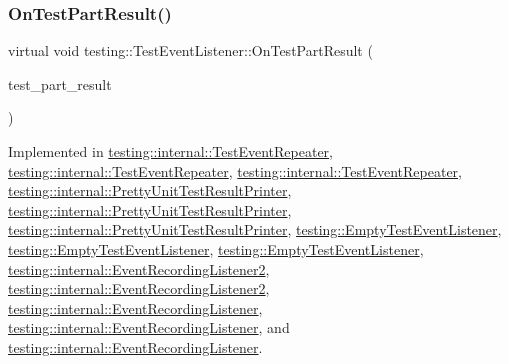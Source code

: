 \subsubsection{\texorpdfstring{OnTestPartResult()}{OnTestPartResult()}\hspace{0.1cm}{\footnotesize\ttfamily [2/3]}}
{\footnotesize\ttfamily virtual void testing\+::\+Test\+Event\+Listener\+::\+On\+Test\+Part\+Result (\begin{DoxyParamCaption}\item[{const Test\+Part\+Result \&}]{test\+\_\+part\+\_\+result }\end{DoxyParamCaption})\hspace{0.3cm}{\ttfamily [pure virtual]}}



Implemented in \mbox{\hyperlink{classtesting_1_1internal_1_1_test_event_repeater_aaf15a326277f2b2900f8b3624fb27562}{testing\+::internal\+::\+Test\+Event\+Repeater}}, \mbox{\hyperlink{classtesting_1_1internal_1_1_test_event_repeater_aaf15a326277f2b2900f8b3624fb27562}{testing\+::internal\+::\+Test\+Event\+Repeater}}, \mbox{\hyperlink{classtesting_1_1internal_1_1_test_event_repeater_ac8fb21da6802b1ebab9cad3eee9150eb}{testing\+::internal\+::\+Test\+Event\+Repeater}}, \mbox{\hyperlink{classtesting_1_1internal_1_1_pretty_unit_test_result_printer_a89caba1698d6999082e938f814dd8ece}{testing\+::internal\+::\+Pretty\+Unit\+Test\+Result\+Printer}}, \mbox{\hyperlink{classtesting_1_1internal_1_1_pretty_unit_test_result_printer_a89caba1698d6999082e938f814dd8ece}{testing\+::internal\+::\+Pretty\+Unit\+Test\+Result\+Printer}}, \mbox{\hyperlink{classtesting_1_1internal_1_1_pretty_unit_test_result_printer_a9c7ca0e58ea0fc96d635ed0cea410ed9}{testing\+::internal\+::\+Pretty\+Unit\+Test\+Result\+Printer}}, \mbox{\hyperlink{classtesting_1_1_empty_test_event_listener_ab95992f0a0b3741d59a24c3a7115fa60}{testing\+::\+Empty\+Test\+Event\+Listener}}, \mbox{\hyperlink{classtesting_1_1_empty_test_event_listener_ab95992f0a0b3741d59a24c3a7115fa60}{testing\+::\+Empty\+Test\+Event\+Listener}}, \mbox{\hyperlink{classtesting_1_1_empty_test_event_listener_a59e7f7d9f2e2d089a6e8c1e2577f4718}{testing\+::\+Empty\+Test\+Event\+Listener}}, \mbox{\hyperlink{classtesting_1_1internal_1_1_event_recording_listener2_a0c7bd2ef9f0e467b408dcb4c984cb3fc}{testing\+::internal\+::\+Event\+Recording\+Listener2}}, \mbox{\hyperlink{classtesting_1_1internal_1_1_event_recording_listener2_a0c7bd2ef9f0e467b408dcb4c984cb3fc}{testing\+::internal\+::\+Event\+Recording\+Listener2}}, \mbox{\hyperlink{classtesting_1_1internal_1_1_event_recording_listener_a9122b67d43420a41d1cfe9307809e078}{testing\+::internal\+::\+Event\+Recording\+Listener}}, \mbox{\hyperlink{classtesting_1_1internal_1_1_event_recording_listener_a9122b67d43420a41d1cfe9307809e078}{testing\+::internal\+::\+Event\+Recording\+Listener}}, and \mbox{\hyperlink{classtesting_1_1internal_1_1_event_recording_listener_a4a6685d894923f1691ad9c6a4311470e}{testing\+::internal\+::\+Event\+Recording\+Listener}}.

